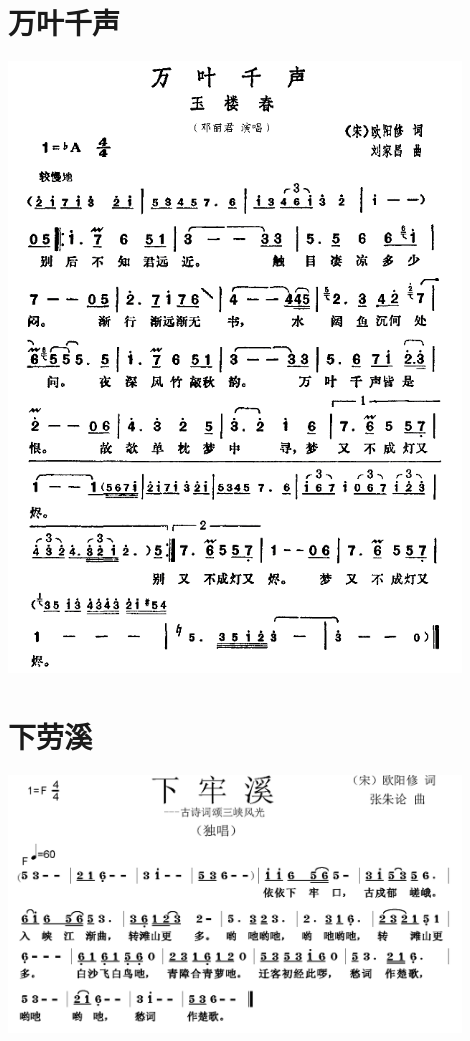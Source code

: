 \documentclass[cn,pad,twocol]{elegantbook}
\begin{document}
\section{万叶千声} \includegraphics[width=0.9\textwidth]{rpi400/20210212欧阳修-万叶千声.png}
\section{下劳溪} \includegraphics[width=0.9\textwidth]{rpi400/20210212欧阳修-下劳溪.png}
\end{document}
